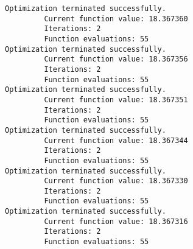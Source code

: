 \documentclass[11pt]{article}
\begin{document}
\begin{Verbatim}[commandchars=\\\{\}]
Optimization terminated successfully.
         Current function value: 18.367360
         Iterations: 2
         Function evaluations: 55
Optimization terminated successfully.
         Current function value: 18.367356
         Iterations: 2
         Function evaluations: 55
Optimization terminated successfully.
         Current function value: 18.367351
         Iterations: 2
         Function evaluations: 55
Optimization terminated successfully.
         Current function value: 18.367344
         Iterations: 2
         Function evaluations: 55
Optimization terminated successfully.
         Current function value: 18.367330
         Iterations: 2
         Function evaluations: 55
Optimization terminated successfully.
         Current function value: 18.367316
         Iterations: 2
         Function evaluations: 55

    \end{Verbatim}
\end{document}
